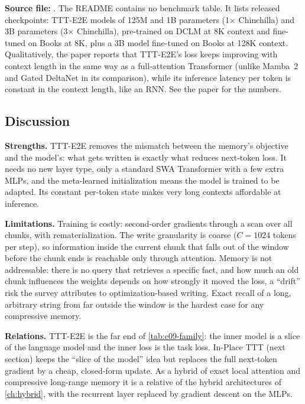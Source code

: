 \begin{results}
\textbf{Source file:} . The README contains
no benchmark table. It lists released checkpoints: TTT-E2E models of 125M and 1B parameters
(1$\times$ Chinchilla) and 3B parameters (3$\times$ Chinchilla), pre-trained on DCLM at 8K
context and fine-tuned on Books at 8K, plus a 3B model fine-tuned on Books at 128K context.
Qualitatively, the paper reports that TTT-E2E's loss keeps improving with context length in
the same way as a full-attention Transformer (unlike Mamba~2 and Gated DeltaNet in its
comparison), while its inference latency per token is constant in the context length, like
an RNN. See the paper for the numbers.
\end{results}

\subsection{Discussion}

\textbf{Strengths.} TTT-E2E removes the mismatch between the memory's objective and the
model's: what gets written is exactly what reduces next-token loss. It needs no new layer type,
only a standard SWA Transformer with a few extra MLPs, and the meta-learned initialization
means the model is trained to be adapted. Its constant per-token state makes very long
contexts affordable at inference.

\textbf{Limitations.} Training is costly: second-order gradients through a scan over all chunks,
with rematerialization. The write granularity is coarse ($C = 1024$ tokens per step), so
information inside the current chunk that falls out of the window before the chunk ends is
reachable only through attention. Memory is not addressable: there is no query that retrieves a
specific fact, and how much an old chunk influences the weights depends on how strongly it
moved the loss, a ``drift'' risk the survey attributes to optimization-based writing. Exact
recall of a long, arbitrary string from far outside the window is the hardest case for any
compressive memory.

\textbf{Relations.} TTT-E2E is the far end of \cref{tab:c09-family}: the inner model is a slice
of the language model and the inner loss is the task loss. In-Place TTT (next section) keeps
the ``slice of the model'' idea but replaces the full next-token gradient by a cheap,
closed-form update. As a hybrid of exact local attention and compressive long-range memory it
is a relative of the hybrid architectures of \cref{ch:hybrid}, with the recurrent layer
replaced by gradient descent on the MLPs.

